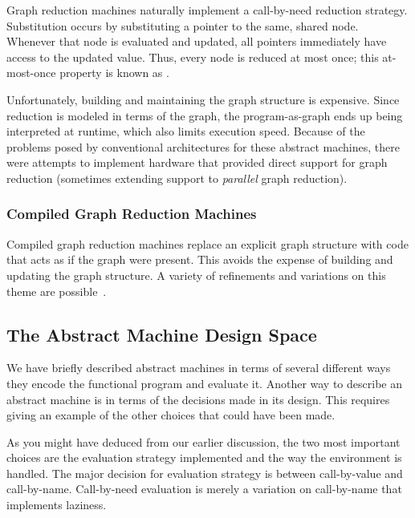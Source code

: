 Graph reduction machines naturally implement a call-by-need reduction strategy. Substitution occurs by substituting a pointer to the same, shared node. Whenever that node is evaluated and updated, all pointers immediately have access to the updated value. Thus, every node is reduced at most once; this at-most-once property is known as .

Unfortunately, building and maintaining the graph structure is expensive. Since reduction is modeled in terms of the graph, the program-as-graph ends up being interpreted at runtime, which also limits execution speed. Because of the problems posed by conventional architectures for these abstract machines, there were attempts to implement hardware that provided direct support for graph reduction (sometimes extending support to \emph{parallel} graph reduction).

\subsubsection[Compiled Graph Reduction]{Compiled Graph Reduction Machines}
Compiled graph reduction machines replace an explicit graph structure with code that acts as if the graph were present. This avoids the expense of building and updating the graph structure. A variety of refinements and variations on this theme are possible~\citep{Johnsson:Efficient:2004,Burn:The-spineless:1988,Peyton-Jones:The-Spineless:1989,Reid:Putting:1999,Marlow:Faster:2007,Peyton-Jones:Call-pattern:2007}.

\subsection{The Abstract Machine Design Space}
We have briefly described abstract machines in terms of several different ways they encode the functional program and evaluate it. Another way to describe an abstract machine is in terms of the decisions made in its design. This requires giving an example of the other choices that could have been made.

As you might have deduced from our earlier discussion, the two most important choices are the evaluation strategy implemented and the way the environment is handled. The major decision for evaluation strategy is between call-by-value and call-by-name. Call-by-need evaluation is merely a variation on call-by-name that implements laziness.


